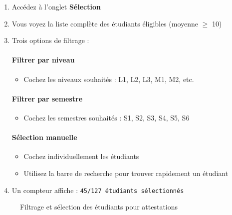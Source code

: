 \begin{enumerate}[leftmargin=*]
    \item Accédez à l'onglet \textbf{Sélection}
    \item Vous voyez la liste complète des étudiants éligibles (moyenne $\geq$ 10)
    \item Trois options de filtrage :

    \paragraph{Filtrer par niveau}
    \begin{itemize}
        \item Cochez les niveaux souhaités : L1, L2, L3, M1, M2, etc.
    \end{itemize}

    \paragraph{Filtrer par semestre}
    \begin{itemize}
        \item Cochez les semestres souhaités : S1, S2, S3, S4, S5, S6
    \end{itemize}

    \paragraph{Sélection manuelle}
    \begin{itemize}
        \item Cochez individuellement les étudiants
        \item Utilisez la barre de recherche pour trouver rapidement un étudiant
    \end{itemize}

    \item Un compteur affiche : \texttt{45/127 étudiants sélectionnés}
\end{enumerate}

\begin{figure}[h]
    \centering
    \caption{Filtrage et sélection des étudiants pour attestations}
\end{figure}

